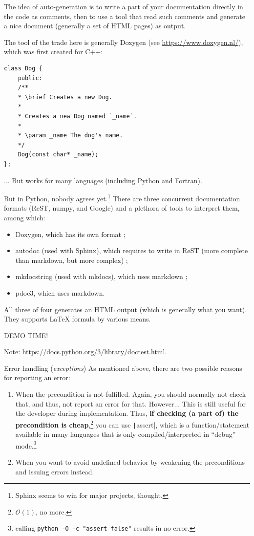 \documentclass[10pt,
aspectratio=169
]{beamer}
\begin{document}
\begin{frame}[fragile]
	The idea of auto-generation is to write a part of your documentation directly in the code as comments, then to use a tool that read such comments  and generate a nice document (generally a set of HTML pages) as output. 
	
	The tool of the trade here is generally Doxygen (see \url{https://www.doxygen.nl/}), which was first created for C++:
	\begin{verbatim}
class Dog {
	public:
	/**
	* \brief Creates a new Dog.
	*
	* Creates a new Dog named `_name`.
	*
	* \param _name The dog's name.
	*/
	Dog(const char* _name);
};
	\end{verbatim}
	... But works for many languages (including Python and Fortran).
\end{frame}

\begin{frame}
	But in Python, nobody  agrees yet.\footnote{Sphinx seems to win for major projects, thought.} There are three concurrent documentation formats (ReST, numpy, and Google) and a plethora of tools to interpret them, among which:\begin{itemize}
		\item Doxygen, which has its own format ;
		\item autodoc (used with Sphinx), which requires to write in ReST (more complete than markdown, but more complex) ;
		\item mkdocstring (used with mkdocs), which uses markdown ;
		\item pdoc3, which uses markdown.
	\end{itemize}
	All three of four generates an HTML output (which is generally what you want). They supports LaTeX formula by various means.
\end{frame}

\begin{frame}
	\begin{center}
		{\LARGE DEMO TIME!}
	\end{center}
	
	Note: \url{https://docs.python.org/3/library/doctest.html}.
\end{frame}
\begin{frame}{Error handling (\textit{exceptions})}
As mentioned above, there are two possible reasons for reporting an error:\begin{enumerate}
	\item When the precondition is not fulfilled. Again, you should normally not check that, and thus, not report an error for that. However... This is still useful for the developer during implementation. Thus, \textbf{if checking (a part of) the precondition is cheap},\footnote{$\mathcal{O}(1)$, no more.} you can use \texttt|assert|, which is a function/statement available in many languages that is only compiled/interpreted in ``debug'' mode.\footnote{calling \texttt{python -O -c "assert false"} results in no error.}
	\item When you want to avoid undefined behavior by weakening the preconditions and issuing errors instead.
\end{enumerate}
\end{frame}
\end{document}
